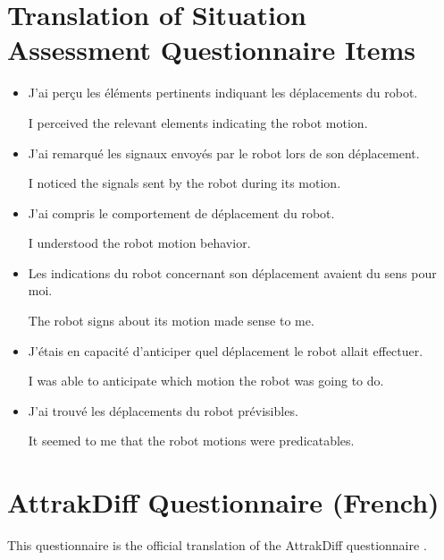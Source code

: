\section{Translation of Situation Assessment Questionnaire Items}
\begin{itemize}
\item J'ai perçu les éléments pertinents indiquant les déplacements du robot.

I perceived the relevant elements indicating the robot motion.

\item J'ai remarqué les signaux envoyés par le robot lors de son déplacement.

I noticed the signals sent by the robot during its motion.

\item J'ai compris le comportement de déplacement du robot.

I understood the robot motion behavior.

\item Les indications du robot concernant son déplacement avaient du sens pour moi.

The robot signs about its motion made sense to me.

\item J'étais en capacité d'anticiper quel déplacement le robot allait effectuer.

I was able to anticipate which motion the robot was going to do.

\item J'ai trouvé les déplacements du robot prévisibles.

It seemed to me that the robot motions were predicatables.
\end{itemize}

\section{AttrakDiff Questionnaire (French)}
This questionnaire is the official translation of the AttrakDiff questionnaire \cite{lallemand_creation_2015}.

